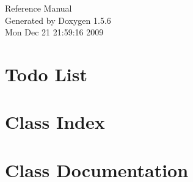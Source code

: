 \documentclass[a4paper]{book}
\begin{document}
\begin{titlepage}
\vspace*{7cm}
\begin{center}
{\Large Reference Manual}\\
\vspace*{1cm}
{\large Generated by Doxygen 1.5.6}\\
\vspace*{0.5cm}
{\small Mon Dec 21 21:59:16 2009}\\
\end{center}
\end{titlepage}
\clearemptydoublepage
{}
\tableofcontents
\clearemptydoublepage
{}
\chapter{Todo List}
\label{todo}
\hypertarget{todo}{}

\chapter{Class Index}

\chapter{Class Documentation}























\printindex
\end{document}
